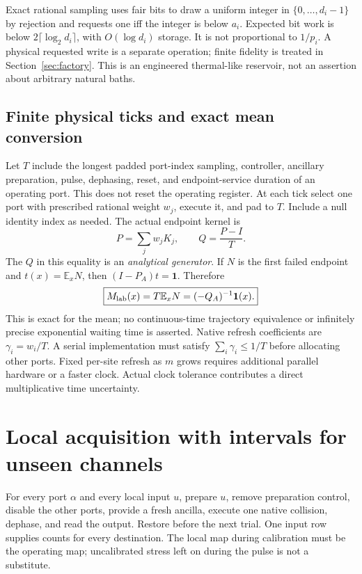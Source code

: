 \documentclass[10pt,a4paper]{article}
\theoremstyle{definition}\newtheorem{assumption}[theorem]{Assumption}
\newcommand{\E}{\mathbb E}
\newcommand{\one}{\mathbf 1}
\begin{document}
Exact rational sampling uses fair bits to draw a uniform integer in $\{0,\ldots,d_i-1\}$ by rejection and requests one iff the integer is below $a_i$. Expected bit work is below $2\lceil\log_2d_i\rceil$, with $O(\log d_i)$ storage. It is not proportional to $1/p_i$. A physical requested write is a separate operation; finite fidelity is treated in Section~\ref{sec:factory}. This is an engineered thermal-like reservoir, not an assertion about arbitrary natural baths.

\subsection{Finite physical ticks and exact mean conversion}
\label{sec:clock}

Let $T$ include the longest padded port-index sampling, controller, ancillary preparation, pulse, dephasing, reset, and endpoint-service duration of an operating port. This does not reset the operating register. At each tick select one port with prescribed rational weight $w_j$, execute it, and pad to $T$. Include a null identity index as needed. The actual endpoint kernel is
\begin{equation}
 P=\sum_j w_jK_j,\qquad Q=\frac{P-I}{T}.
 \label{eq:physicalclock}
\end{equation}
The $Q$ in this equality is an \emph{analytical generator}. If $N$ is the first failed endpoint and $t(x)=\E_xN$, then
$(I-P_A)t=\one$. Therefore
\begin{equation}
 \boxed{M_{\rm lab}(x)=T\E_xN=(-Q_A)^{-1}\one(x).}
 \label{eq:exactphysicalmean}
\end{equation}
This is exact for the mean; no continuous-time trajectory equivalence or infinitely precise exponential waiting time is asserted. Native refresh coefficients are $\gamma_i=w_i/T$. A serial implementation must satisfy $\sum_i\gamma_i\le1/T$ before allocating other ports. Fixed per-site refresh as $m$ grows requires additional parallel hardware or a faster clock. Actual clock tolerance contributes a direct multiplicative time uncertainty.

\section{Local acquisition with intervals for unseen channels}
\label{sec:acquisition}

For every port $\alpha$ and every local input $u$, prepare $u$, remove preparation control, disable the other ports, provide a fresh ancilla, execute one native collision, dephase, and read the output. Restore before the next trial. One input row supplies counts for every destination. The local map during calibration must be the operating map; uncalibrated stress left on during the pulse is not a substitute.
\end{document}
